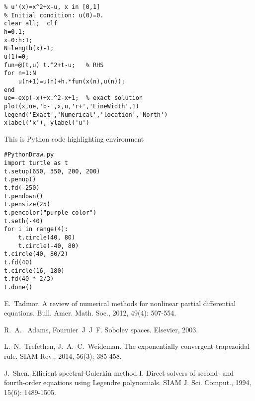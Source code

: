 \documentclass[12pt,en]{homework}
\begin{document}
\begin{lstlisting}[style=matlab,title={MATLAB code}]
% Euler method for the ODE model
% u'(x)=x^2+x-u, x in [0,1]
% Initial condition: u(0)=0.
clear all;  clf
h=0.1;
x=0:h:1;
N=length(x)-1;
u(1)=0;
fun=@(t,u) t.^2+t-u;   % RHS
for n=1:N
    u(n+1)=u(n)+h.*fun(x(n),u(n));
end
ue=-exp(-x)+x.^2-x+1;  % exact solution
plot(x,ue,'b-',x,u,'r+','LineWidth',1)
legend('Exact','Numerical','location','North')
xlabel('x'), ylabel('u')
\end{lstlisting}

This is Python code highlighting environment

\begin{lstlisting}[style=python,title={Python code}]
#PythonDraw.py
import turtle as t
t.setup(650, 350, 200, 200)
t.penup()
t.fd(-250)
t.pendown()
t.pensize(25)
t.pencolor("purple color")
t.seth(-40)
for i in range(4):
    t.circle(40, 80)
    t.circle(-40, 80)
t.circle(40, 80/2)
t.fd(40)
t.circle(16, 180)
t.fd(40 * 2/3)
t.done()
\end{lstlisting}


\clearpage
\begin{thebibliography}{99}
 E.~Tadmor. A review of numerical methods for nonlinear partial differential equations. Bull. Amer. Math. Soc., 2012, 49(4): 507-554.

 R.~A.~ Adams, Fournier~J~J~F. Sobolev spaces. Elsevier, 2003.

 L.~N.~Trefethen, J.~A.~C.~Weideman. The exponentially convergent trapezoidal rule. SIAM Rev., 2014, 56(3): 385-458.

 J.~Shen. Efficient spectral-Galerkin method I. Direct solvers of second- and fourth-order equations using Legendre polynomials. SIAM J. Sci. Comput., 1994, 15(6): 1489-1505.

\end{thebibliography}
\end{document}
